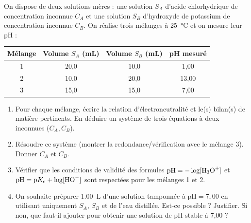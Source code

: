\documentclass[11pt]{article}
\begin{document}
\begin{exercice}
On dispose de deux solutions mères : une solution $S_A$ d'acide chlorhydrique  de concentration inconnue $C_A$ et une solution $S_B$ d'hydroxyde de potassium  de concentration inconnue $C_B$. On réalise trois mélanges à \SI{25}{\celsius} et on mesure leur pH :
\begin{center}
\begin{tabular}{c|c|c|c}
Mélange & Volume $S_A$ (\si{\milli\liter}) & Volume $S_B$ (\si{\milli\liter}) & pH mesuré \\
\hline
1 & 20,0 & 10,0 & 1,00 \\
2 & 10,0 & 20,0 & 13,00 \\
3 & 15,0 & 15,0 & 7,00 \\
\end{tabular}
\end{center}
\begin{enumerate}
    \item Pour chaque mélange, écrire la relation d'électroneutralité et le(s) bilan(s) de matière pertinents. En déduire un système de trois équations à deux inconnues ($C_A, C_B$).
    \item Résoudre ce système (montrer la redondance/vérification avec le mélange 3). Donner $C_A$ et $C_B$.
    \item Vérifier que les conditions de validité des formules $\text{pH} = -\log[\ce{H3O+}]$ et $\text{pH} = \text{p}K_\text{e} + \log[\ce{HO-}]$ sont respectées pour les mélanges 1 et 2.
    \item On souhaite préparer \SI{1,00}{\liter} d'une solution tamponnée à $\text{pH} = 7,00$ en utilisant uniquement $S_A$, $S_B$ et de l'eau distillée. Est-ce possible ? Justifier. Si non, que faut-il ajouter pour obtenir une solution de pH stable à 7,00 ?
\end{enumerate}
\end{exercice}
\end{document}
